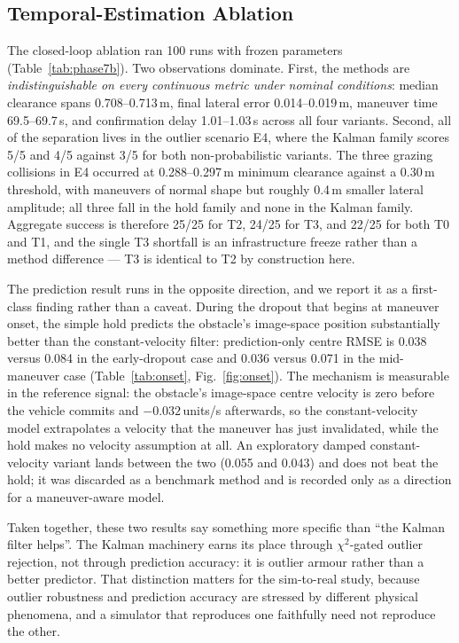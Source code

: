 \subsection{Temporal-Estimation Ablation}

The closed-loop ablation ran 100 runs with frozen parameters
(Table~\ref{tab:phase7b}). Two observations dominate. First, the methods are
\emph{indistinguishable on every continuous metric under nominal conditions}:
median clearance spans 0.708--0.713\,m, final lateral error 0.014--0.019\,m,
maneuver time 69.5--69.7\,s, and confirmation delay 1.01--1.03\,s across all
four variants. Second, all of the separation lives in the outlier scenario
E4, where the Kalman family scores 5/5 and 4/5 against 3/5 for both
non-probabilistic variants. The three grazing collisions in E4 occurred at
0.288--0.297\,m minimum clearance against a 0.30\,m threshold, with maneuvers
of normal shape but roughly 0.4\,m smaller lateral amplitude; all three fall
in the hold family and none in the Kalman family. Aggregate success is
therefore 25/25 for T2, 24/25 for T3, and 22/25 for both T0 and T1, and the
single T3 shortfall is an infrastructure freeze rather than a method
difference --- T3 is identical to T2 by construction here.



The prediction result runs in the opposite direction, and we report it as a
first-class finding rather than a caveat. During the dropout that begins at
maneuver onset, the simple hold predicts the obstacle's image-space position
substantially better than the constant-velocity filter: prediction-only
centre RMSE is 0.038 versus 0.084 in the early-dropout case and 0.036 versus
0.071 in the mid-maneuver case (Table~\ref{tab:onset},
Fig.~\ref{fig:onset}). The mechanism is measurable in the reference signal:
the obstacle's image-space centre velocity is zero before the vehicle
commits and $-0.032$\,units/s afterwards, so the constant-velocity model
extrapolates a velocity that the maneuver has just invalidated, while the
hold makes no velocity assumption at all. An exploratory damped
constant-velocity variant lands between the two (0.055 and 0.043) and does
not beat the hold; it was discarded as a benchmark method and is recorded
only as a direction for a maneuver-aware model.




Taken together, these two results say something more specific than ``the
Kalman filter helps''. The Kalman machinery earns its place through
$\chi^2$-gated outlier rejection, not through prediction accuracy: it is
outlier armour rather than a better predictor. That distinction matters for
the sim-to-real study, because outlier robustness and prediction accuracy are
stressed by different physical phenomena, and a simulator that reproduces one
faithfully need not reproduce the other.

